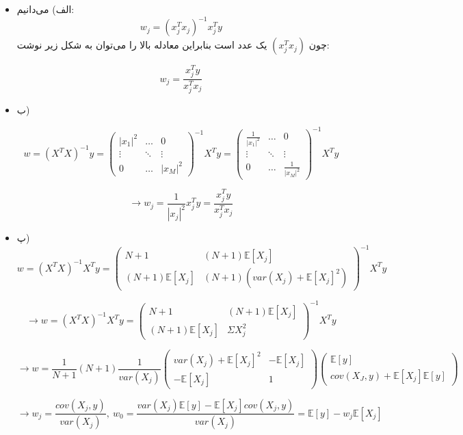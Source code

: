
\begin{itemize}
	\item الف)
%	
%	
%	
	می‌دانیم:
	$$
	w_j = (x_j^Tx_j)^{-1}x_j^Ty
	$$
	چون $(x_j^Tx_j)$ یک عدد است بنابراین معادله بالا را می‌توان به شکل زیر نوشت:
	
	$$
	w_j = \frac{x_j^Ty}{x_j^Tx_j}
	$$
	\item ب)
	
	$$
	w = (X^TX)^{-1}y = \begin{pmatrix}
		|x_1|^2 & \dots & 0 \\
		\vdots & \ddots & \vdots\\
		0 & \dots & |x_M|^2
	\end{pmatrix}^{-1}X^Ty = \begin{pmatrix}
	\frac{1}{|x_1|^2} & \dots & 0 \\
	\vdots & \ddots & \vdots\\
	0 & \dots & \frac{1}{|x_M|^2}
	\end{pmatrix}^{-1}X^Ty
	$$
	
	$$
	\rightarrow w_j = \frac{1}{|x_j|^2}x_j^Ty= \frac{x_j^Ty}{x_j^Tx_j}
	$$
	\item پ)
	$$
	w = (X^TX)^{-1}X^Ty = \begin{pmatrix}
	N + 1 & (N+1) \mathbb{E}[X_j]\\
	(N + 1)\mathbb{E}[X_j] & (N + 1)(var(X_j) + \mathbb{E}[X_j]^2)
	\end{pmatrix}^{-1}X^Ty
	$$
	
	$$
	\rightarrow
	w = (X^TX)^{-1}X^Ty = \begin{pmatrix}
	N + 1 & (N+1) \mathbb{E}[X_j]\\
	(N + 1)\mathbb{E}[X_j] & \Sigma X_j^2
	\end{pmatrix}^{-1}X^Ty
	$$
	
	$$
	\rightarrow
	w = \frac{1}{N + 1} (N + 1) \frac{1}{var(X_j)}\begin{pmatrix}
	var(X_j) + \mathbb{E}[X_j]^2 & -\mathbb{E}[X_j]\\
	-\mathbb{E}[X_j] & 1
	\end{pmatrix}\begin{pmatrix}
	\mathbb{E}[y]\\
	cov(X_J, y) + \mathbb{E}[X_j]\mathbb{E}[y]
	\end{pmatrix}
	$$
	
	$$
	\rightarrow
	w_j = \frac{cov(X_j, y)}{var(X_j)}, \: w_0 = \frac{var(X_j)\mathbb{E}[y] - \mathbb{E}[X_j]cov(X_j, y)}{var(X_j)} = \mathbb{E}[y] - w_j \mathbb{E}[X_j]
	$$
%	
\end{itemize}
